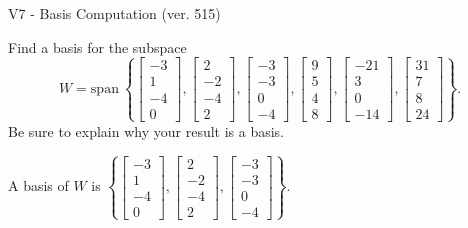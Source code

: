 \begin{exercise}
  \begin{exerciseTitle}V7 - Basis Computation (ver. 515)\end{exerciseTitle}
  \begin{exerciseStatement}
    Find a basis for the subspace 
\[W=\mathrm{span}\ \left\{\left[\begin{array}{r}
-3 \\
1 \\
-4 \\
0
\end{array}\right] , \left[\begin{array}{r}
2 \\
-2 \\
-4 \\
2
\end{array}\right] , \left[\begin{array}{r}
-3 \\
-3 \\
0 \\
-4
\end{array}\right] , \left[\begin{array}{r}
9 \\
5 \\
4 \\
8
\end{array}\right] , \left[\begin{array}{r}
-21 \\
3 \\
0 \\
-14
\end{array}\right] , \left[\begin{array}{r}
31 \\
7 \\
8 \\
24
\end{array}\right]\right\}.\]
 Be sure to explain why your result is a basis.


  \end{exerciseStatement}
  \begin{exerciseAnswer}
   A basis of \(W\) is  \(\left\{\left[\begin{array}{r}
-3 \\
1 \\
-4 \\
0
\end{array}\right] , \left[\begin{array}{r}
2 \\
-2 \\
-4 \\
2
\end{array}\right] , \left[\begin{array}{r}
-3 \\
-3 \\
0 \\
-4
\end{array}\right]\right\}\).
  


  \end{exerciseAnswer}
\end{exercise}